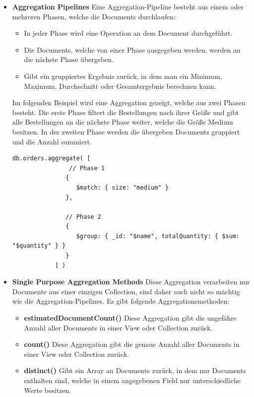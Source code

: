 \begin{itemize}
    \item \textbf{Aggregation Pipelines}
        \newline
         Eine Aggregation-Pipeline besteht aus einem oder mehreren Phasen, welche die Documents durchlaufen:
        \begin{itemize}
            \item In jeder Phase wird eine Operation an dem Document durchgeführt.
            \item Die Documents, welche von einer Phase ausgegeben werden, werden an die nächste Phase übergeben.
            \item Gibt ein gruppiertes Ergebnis zurück, in dem man ein Minimum, Maximum, Durchschnitt oder Gesamtergebnis berechnen kann.
        \end{itemize}
        Im folgenden Beispiel wird eine Aggregation gezeigt, welche aus zwei Phasen besteht. Die erste Phase filtert die Bestellungen nach ihrer Größe und gibt alle Bestellungen an die nächste Phase weiter, welche die Größe Medium besitzen. In der zweiten Phase werden die übergeben Documents gruppiert und die Anzahl summiert.
        \begin{lstlisting}[caption=Aggregation Pipeline]
            db.orders.aggregate( [
                // Phase 1
               {
                  $match: { size: "medium" }
               },
            
               // Phase 2
               {
                  $group: { _id: "$name", totalQuantity: { $sum: "$quantity" } }
               }
            ] )
        \end{lstlisting}
    \item \textbf{Single Purpose Aggregation Methods}
        \newline
        Diese Aggregation verarbeiten nur Documente aus einer einzigen Collection, sind daher auch nicht so mächtig wie die Aggregation-Pipelines. Es gibt folgende Aggregationsmethoden:
        \begin{itemize}
            \item \textbf{estimatedDocumentCount()}
                \newline
                Diese Aggregation gibt die ungefähre Anzahl aller Documents in einer View oder Collection zurück.
            \item \textbf{count()}
                \newline
                Diese Aggregation gibt die genaue Anzahl aller Documents in einer View oder Collection zurück.
            \item \textbf{distinct()}
                \newline
                Gibt ein Array an Documents zurück, in dem nur Documents enthalten sind, welche in einem angegebenen Field nur unterschiedliche Werte besitzen.
        \end{itemize}
\end{itemize}
